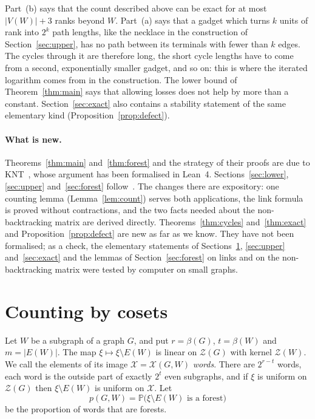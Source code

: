 \documentclass[11pt]{article}
\theoremstyle{definition}
\theoremstyle{remark}
\newcommand{\Z}{\mathcal{Z}}
\newcommand{\X}{\mathcal{X}}
\newcommand{\PP}{\mathbb{P}}
\newcommand{\sm}{\setminus}
\begin{document}
Part~(b) says that the count described above can be exact for at most $|V(W)|+3$ ranks beyond $W$.
Part~(a) says that a gadget which turns $k$ units of rank into $2^{k}$ path lengths, like the necklace
in the construction of Section~\ref{sec:upper}, has no path between its terminals with fewer than $k$ edges. The cycles
through it are therefore long, the short cycle lengths have to come from a second, exponentially
smaller gadget, and so on: this is where the iterated logarithm comes from in the construction. The
lower bound of Theorem~\ref{thm:main} says that allowing losses does not help by more than a constant.
Section~\ref{sec:exact} also contains a stability statement of the same elementary kind
(Proposition~\ref{prop:defect}).

\paragraph{What is new.}
Theorems~\ref{thm:main} and~\ref{thm:forest} and the strategy of their proofs are due to
KNT~\cite{KNT}, whose argument has been formalised in Lean~4. Sections~\ref{sec:lower},
\ref{sec:upper} and~\ref{sec:forest} follow~\cite{KNT}. The changes there are expository: one counting
lemma (Lemma~\ref{lem:count}) serves both applications, the link formula is proved without
contractions, and the two facts needed about the non-backtracking matrix are derived directly.
Theorems~\ref{thm:cycles} and~\ref{thm:exact} and Proposition~\ref{prop:defect} are new as far as we
know. They have not been formalised; as a check, the elementary statements of
Sections~\ref{sec:count}, \ref{sec:upper} and~\ref{sec:exact} and the lemmas of
Section~\ref{sec:forest} on links and on the non-backtracking matrix were tested by computer on
small graphs.

\section{Counting by cosets}\label{sec:count}

Let $W$ be a subgraph of a graph $G$, and put $r=\beta(G)$, $t=\beta(W)$ and $m=|E(W)|$. The map
$\xi\mapsto\xi\sm E(W)$ is linear on $\Z(G)$ with kernel $\Z(W)$. We call the elements of its image
$\X=\X(G,W)$ \emph{words}. There are $2^{r-t}$ words, each word is the outside part of exactly $2^{t}$
even subgraphs, and if $\xi$ is uniform on $\Z(G)$ then $\xi\sm E(W)$ is uniform on $\X$. Let
\[
  p(G,W)=\PP\bigl(\xi\sm E(W)\text{ is a forest}\bigr)
\]
be the proportion of words that are forests.
\end{document}
